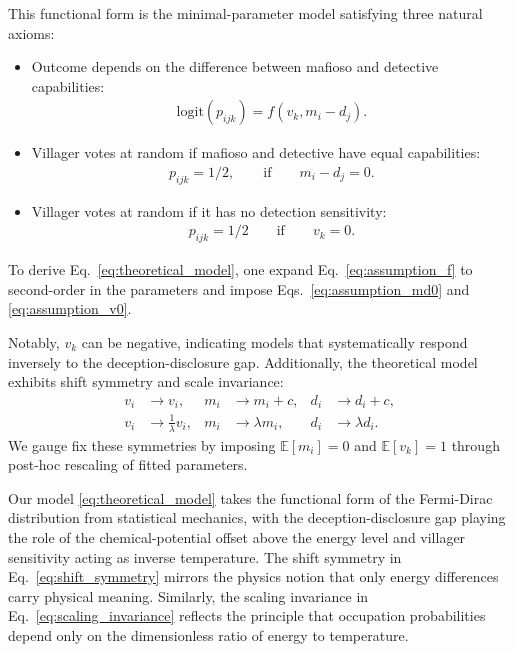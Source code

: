 \documentclass{article}
\begin{document}
This functional form is the minimal-parameter model satisfying three natural axioms:
\begin{itemize}
    \item Outcome depends on the difference between mafioso and detective capabilities:
    \begin{align}
        \text{logit}(p_{ijk})=f(v_k,m_i-d_j).
        \label{eq:assumption_f}
    \end{align}
    \item Villager votes at random if mafioso and detective have equal capabilities:
    \begin{align}
        p_{ijk}=1/2,\qquad\text{if} \qquad m_i-d_j=0.
        \label{eq:assumption_md0}
    \end{align}
    \item Villager votes at random if it has no detection sensitivity:
    \begin{align}
        p_{ijk}=1/2\qquad\text{if}\qquad v_k=0.
        \label{eq:assumption_v0}
    \end{align}
\end{itemize}
To derive Eq.~\eqref{eq:theoretical_model}, one expand Eq.~\eqref{eq:assumption_f} to second-order in the parameters and impose Eqs.~\eqref{eq:assumption_md0} and \eqref{eq:assumption_v0}.

Notably, $v_k$ can be negative, indicating models that systematically respond inversely to the deception-disclosure gap. Additionally, the theoretical model exhibits shift symmetry and scale invariance:
\begin{align}
    v_i &\rightarrow v_i, & m_i &\rightarrow m_i + c, & d_i &\rightarrow d_i + c, 
    \label{eq:shift_symmetry} \\
    v_i &\rightarrow \frac{1}{\lambda} v_i, & m_i &\rightarrow \lambda m_i, & d_i &\rightarrow \lambda d_i. \label{eq:scaling_invariance}
\end{align}
We gauge fix these symmetries by imposing $\mathbb{E}[m_i]=0$ and $\mathbb{E}[v_k]=1$ through post-hoc rescaling of fitted parameters.


Our model \eqref{eq:theoretical_model} takes the functional form of the Fermi-Dirac distribution from statistical mechanics, with the deception-disclosure gap playing the role of the chemical-potential offset above the energy level and villager sensitivity acting as inverse temperature. The shift symmetry in Eq.~\eqref{eq:shift_symmetry} mirrors the physics notion that only energy differences carry physical meaning. Similarly, the scaling invariance in Eq.~\eqref{eq:scaling_invariance} reflects the principle that occupation probabilities depend only on the dimensionless ratio of energy to temperature.
\end{document}
